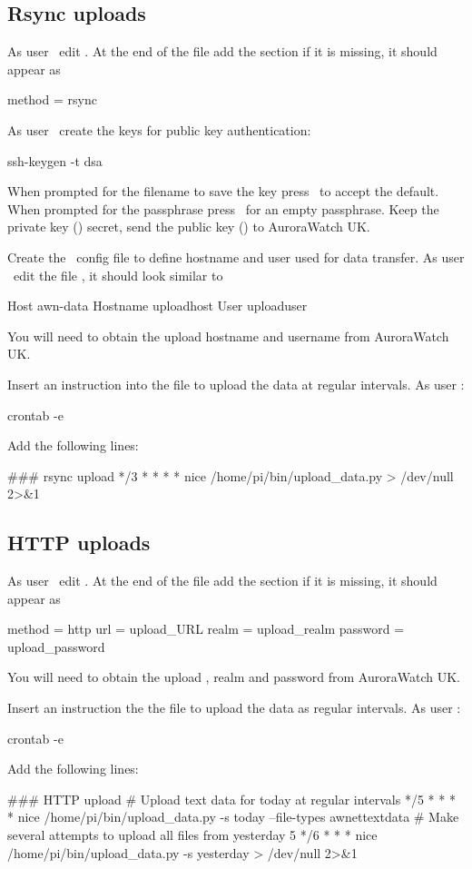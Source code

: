 \subsection{Rsync uploads}

As user \rootUser\ edit . At the end of the
file add the \filename{[upload]} section if it is missing, it should
appear as
\begin{Code}
[upload]
method = rsync
\end{Code}

As user \piUser\ create the keys for public key authentication:
\begin{Cmd}
ssh-keygen -t dsa
\end{Cmd}
When prompted for the filename to save the key press \myreturn\ to
accept the default. When prompted for the passphrase press \myreturn\
for an empty passphrase. Keep the private key
() secret, send the public key
() to AuroraWatch UK.

Create the \ssh\ config file to define hostname and user used for data
transfer. As user \piUser\ edit the file
, it should look similar to
\begin{Code}
Host awn-data
Hostname uploadhost
User uploaduser
\end{Code}
You will need to obtain the upload hostname and username from
AuroraWatch UK.

Insert an instruction into the  file to upload the
data at regular intervals. As user \piUser:
\begin{Cmd}
crontab -e
\end{Cmd}
Add the following lines:
\begin{Code}
### rsync upload
*/3 * * * * nice /home/pi/bin/upload_data.py > /dev/null 2>&1
\end{Code}

\subsection{HTTP uploads}
As user \rootUser\ edit . At the end of the
file add the \filename{[upload]} section if it is missing, it should
appear as
\begin{Code}
[upload]
method = http
url = upload_URL
realm = upload_realm
password = upload_password
\end{Code}
You will need to obtain the upload \URL, realm and password from
AuroraWatch UK.

Insert an instruction the the  file to upload the
data as regular intervals. As user \piUser:
\begin{Cmd}
crontab -e
\end{Cmd}
Add the following lines:
\begin{Code}[fontsize=\small]
### HTTP upload
# Upload text data for today at regular intervals
*/5 * * * * nice /home/pi/bin/upload_data.py -s today --file-types awnettextdata
# Make several attempts to upload all files from yesterday
5 */6 * * * nice /home/pi/bin/upload_data.py -s yesterday > /dev/null 2>&1
\end{Code}
